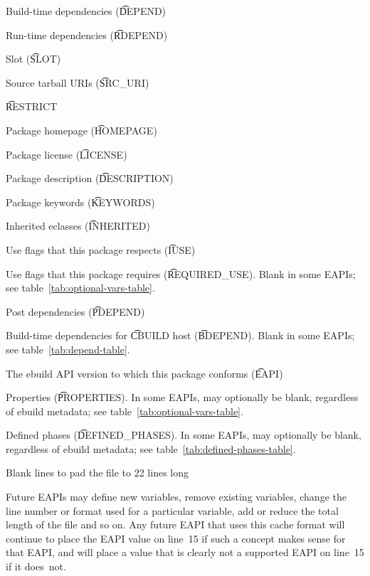 \begin{compactenum}
\item Build-time dependencies (\t{DEPEND})
\item Run-time dependencies (\t{RDEPEND})
\item Slot (\t{SLOT})
\item Source tarball URIs (\t{SRC_URI})
\item \t{RESTRICT}
\item Package homepage (\t{HOMEPAGE})
\item Package license (\t{LICENSE})
\item Package description (\t{DESCRIPTION})
\item Package keywords (\t{KEYWORDS})
\item Inherited eclasses (\t{INHERITED})
\item Use flags that this package respects (\t{IUSE})
\item Use flags that this package requires (\t{REQUIRED_USE}).
    Blank in some EAPIs; see table~\ref{tab:optional-vars-table}.
\item Post dependencies (\t{PDEPEND})
\item Build-time dependencies for \t{CBUILD} host (\t{BDEPEND}).
    Blank in some EAPIs; see table~\ref{tab:depend-table}.
\item The ebuild API version to which this package conforms (\t{EAPI})
\item Properties (\t{PROPERTIES}). In some EAPIs, may optionally be blank, regardless of ebuild
    metadata; see table~\ref{tab:optional-vars-table}.
\item Defined phases (\t{DEFINED_PHASES}). In some EAPIs, may optionally be blank, regardless of
    ebuild metadata; see table~\ref{tab:defined-phases-table}.
\item Blank lines to pad the file to 22 lines long
\end{compactenum}

Future EAPIs may define new variables, remove existing variables, change the line number or
format used for a particular variable, add or reduce the total length of the file and so on.
Any future EAPI that uses this cache format will continue to place the EAPI value on line~15 if
such a concept makes sense for that EAPI, and will place a value that is clearly not a supported
EAPI on line~15 if it does~not.


